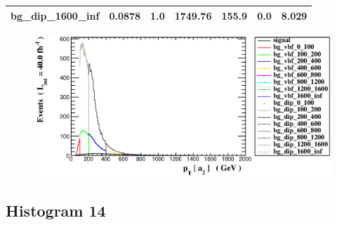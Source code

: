 \documentclass[a4paper, 10pt]{article}
\begin{document}
\begin{table}[H]
\begin{center}
\begin{tabular}{|m{23.0mm}|m{23.0mm}|m{18.0mm}|m{19.0mm}|m{19.0mm}|m{19.0mm}|m{19.0mm}|}
      \hline
      {\cellcolor{white}         bg\_dip\_1600\_inf}& {\cellcolor{white}         0.0878}& {\cellcolor{white}         1.0}& {\cellcolor{white}         1749.76}& {\cellcolor{white}         155.9}& {\cellcolor{orange}         0.0}& {\cellcolor{orange}         8.029}\\
\hline
    \end{tabular}
  \end{center}
\end{table}

\begin{figure}[H]
  \begin{center}
    \includegraphics[scale=0.45]{selection_12.eps}\\
\caption{   }
  \end{center}
\end{figure}
      \newpage
\subsection{ Histogram 14}
\end{document}
